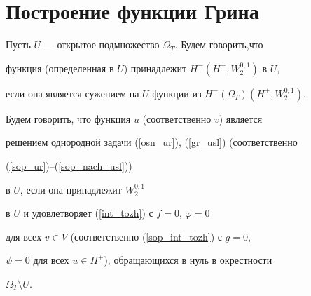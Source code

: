 \section{Построение функции Грина}





Пусть $U$ --- открытое подмножество $\Omega_T$. Будем говорить,что


функция (определенная в $ U$) принадлежит $H^-(H^+, W_2^{0,1})$ в $ U$, 


если она является сужением на $U$ функции из $H^-(\Omega_T)(H^+,W_2^{0,1})$.





Будем говорить, что функция $u$ (соответственно $v$) является


решением однородной задачи (\ref{osn_ur}), (\ref{gr_usl}) (соответственно


(\ref{sop_ur})--(\ref{sop_nach_usl}))


в $U$, если она принадлежит $W_2^{0,1}$


в $U$ и удовлетворяет (\ref{int_tozh}) с $f=0$, $\varphi =0$ 


для всех $v\in V$ (соответственно (\ref{sop_int_tozh}) с $g=0$,


$\psi=0$ для всех $u\in H^+$), обращающихся в нуль в окрестности 


$\Omega_T\setminus U$.


 


